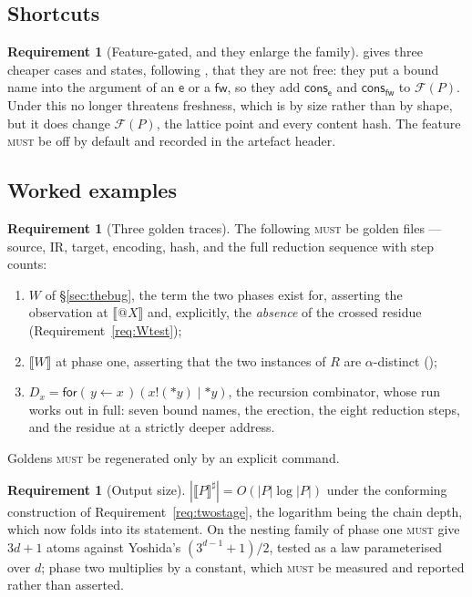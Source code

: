 \documentclass[11pt,a4paper]{article}
\makeatletter
\newcommand{\MUST}{\textsc{must}}
\newcommand{\quo}[1]{@#1}
\newcommand{\drp}[1]{{*}#1}
\newcommand{\inp}[3]{\mathsf{for}(\,#1 \leftarrow #2\,)#3}
\newcommand{\out}[2]{#1!(#2)}
\newcommand{\enc}[1]{\llbracket #1 \rrbracket}
\newcommand{\fw}{\mathsf{fw}}
\newcommand{\ev}{\mathsf{e}}
\newcommand{\cons}{\mathsf{cons}}
\theoremstyle{definition}
\newtheorem{requirement}[definition]{Requirement}
\theoremstyle{plain}
\makeatother
\begin{document}
\subsection{Shortcuts}

\begin{requirement}[Feature-gated, and they enlarge the family]
\label{req:shortcuts}
\cite[Rem.~6.4]{draft3} gives three cheaper cases and states, following
\cite[Rem.~3.13]{draft3}, that they are not free: they put a bound name into
the argument of an $\ev$ or a $\fw$, so they add $\cons_{\ev}$ and
$\cons_{\fw}$ to $\mathcal{F}(P)$. Under
\cite[Lem.~6.14]{draft3} this no longer threatens freshness, which is by size
rather than by shape, but it does change $\mathcal{F}(P)$, the lattice point
and every content hash. The feature \MUST{} be off by default and recorded in
the artefact header.
\end{requirement}

\subsection{Worked examples}

\begin{requirement}[Three golden traces]\label{req:golden}
The following \MUST{} be golden files --- source, IR, target, encoding, hash,
and the full reduction sequence with step counts:
\begin{enumerate}[leftmargin=1.8em,label=(\roman*)]
\item $W$ of \S\ref{sec:thebug}, the term the two phases exist for, asserting
the observation at $\enc{\quo{X}}$ and, explicitly, the \emph{absence} of the
crossed residue (Requirement~\ref{req:Wtest});
\item $\enc{W}$ at phase one, asserting that the two instances of $R$ are
$\alpha$-distinct (\cite[Ex.~6.5]{draft3});
\item $D_{x} = \inp{y}{x}{(\out{x}{\drp{y}} \mid \drp{y})}$, the recursion
combinator, whose run \cite[Ex.~6.9]{draft3} works out in full: seven bound
names, the erection, the eight reduction steps, and the residue at a strictly
deeper address.
\end{enumerate}
Goldens \MUST{} be regenerated only by an explicit command.
\end{requirement}

\begin{requirement}[Output size]\label{req:size}
$|\enc{P}^{\sharp}| = O(|P|\log|P|)$ under the conforming construction of
Requirement~\ref{req:twostage}, the logarithm being the chain depth, which
\cite[Prop.~8.1]{draft3} now folds into its statement. On the nesting family of
\cite[Prop.~8.2]{draft3} phase one \MUST{} give $3d+1$ atoms against Yoshida's
$(3^{d-1}+1)/2$, tested as a law parameterised over $d$; phase two multiplies
by a constant, which \MUST{} be measured and reported rather than asserted.
\end{requirement}
\end{document}
